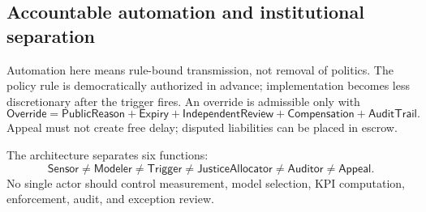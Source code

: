 \documentclass[11pt,a4paper]{article}
\numberwithin{equation}{section}
\theoremstyle{definition}
\theoremstyle{plain}
\theoremstyle{remark}
\begin{document}
\subsection{Accountable automation and institutional separation}

Automation here means rule-bound transmission, not removal of politics. The policy rule is democratically authorized in advance; implementation becomes less discretionary after the trigger fires. An override is admissible only with
\begin{equation}
\mathsf{Override}=
\mathsf{PublicReason}+\mathsf{Expiry}+\mathsf{IndependentReview}
+\mathsf{Compensation}+\mathsf{AuditTrail}.
\label{eq:override}
\end{equation}
Appeal must not create free delay; disputed liabilities can be placed in escrow.

The architecture separates six functions:
\begin{equation}
\boxed{
\mathsf{Sensor}\neq\mathsf{Modeler}\neq\mathsf{Trigger}
\neq\mathsf{JusticeAllocator}\neq\mathsf{Auditor}\neq\mathsf{Appeal}.
}
\label{eq:separation}
\end{equation}
No single actor should control measurement, model selection, KPI computation, enforcement, audit, and exception review.
\end{document}
